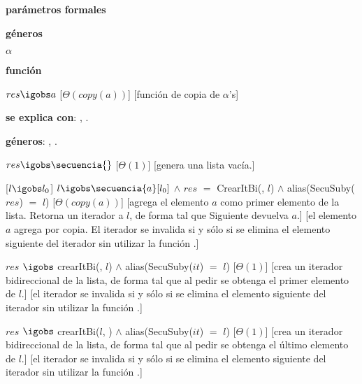 

\begin{Interfaz}

  \textbf{parámetros formales}\parindent\\
  \parbox{1.7cm}{\textbf{géneros}} $\alpha$\\
  \parbox[t]{1.7cm}{\textbf{función}}\parbox[t]{\textwidth-2\parindent-1.7cm}{%
    {$res \igobs a$}
    [$\Theta(copy(a))$]
    [función de copia de $\alpha$'s]
  }

  \textbf{se explica con}: , .

  \textbf{géneros}: , .


  {$res \igobs \secuencia{}$}%
  [$\Theta(1)$]
  [genera una lista vacía.]

  [$l \igobs l_0$]
  {$l \igobs \secuencia{a}[l_0]$ $\land$ $res$ $=$ CrearItBi(\secuencia{}, $l$) $\land$ alias(SecuSuby($res$) $=$ $l$)}
  [$\Theta(copy(a))$]
  [agrega el elemento $a$ como primer elemento de la lista.  Retorna un iterador a $l$, de forma tal que Siguiente devuelva $a$.]
  [el elemento $a$ agrega por copia. El iterador se invalida si y sólo si se elimina el elemento siguiente del iterador sin utilizar la función .]

 

  {$res$ $\igobs$ crearItBi(\secuencia{}, $l$) $\land$ alias(SecuSuby($it$) $=$ $l$)}
  [$\Theta(1)$]
  [crea un iterador bidireccional de la lista, de forma tal que al pedir  se obtenga el primer elemento de $l$.]
  [el iterador se invalida si y sólo si se elimina el elemento siguiente del iterador sin utilizar la función .]

  {$res$ $\igobs$ crearItBi($l$, \secuencia{}) $\land$ alias(SecuSuby($it$) $=$ $l$)}
  [$\Theta(1)$]
  [crea un iterador bidireccional de la lista, de forma tal que al pedir  se obtenga el último elemento de $l$.]  
  [el iterador se invalida si y sólo si se elimina el elemento siguiente del iterador sin utilizar la función .]

\end{Interfaz}

